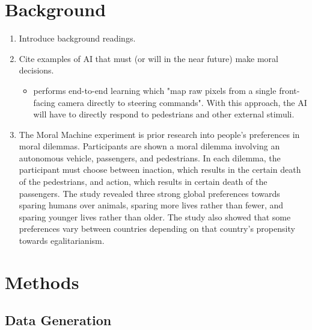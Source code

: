 \documentclass{report}
\begin{document}
\chapter{Background}

\begin{enumerate}
    \item Introduce background readings.
    
    \item Cite examples of AI that must (or will in the near future) make moral decisions.
    \begin{itemize}
        \item \cite{bojarski2016end} performs end-to-end learning which "map raw pixels from a
        single front-facing camera directly to steering commands". With this approach, the AI will
        have to directly respond to pedestrians and other external stimuli.
    \end{itemize}
    
    \item The Moral Machine experiment \cite{awad2018moral} is prior research into people's
    preferences in moral dilemmas. Participants are shown a moral dilemma involving an autonomous
    vehicle, passengers, and pedestrians. In each dilemma, the participant must choose between
    inaction, which results in the certain death of the pedestrians, and action, which results in
    certain death of the passengers. The study revealed three strong global preferences towards
    sparing humans over animals, sparing more lives rather than fewer, and sparing younger lives
    rather than older. The study also showed that some preferences vary between countries depending
    on that country's propensity towards egalitarianism.
\end{enumerate}

\chapter{Methods}

\section{Data Generation}
\end{document}
